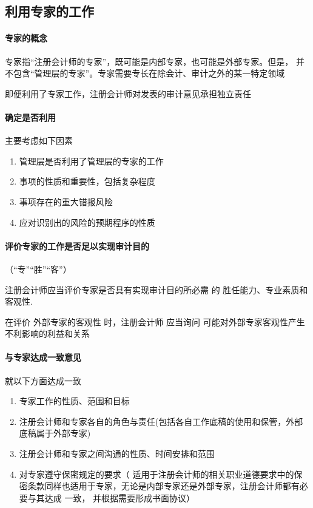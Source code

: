 \documentclass[UTF8,12pt]{ctexart}
\numberwithin{equation}{section} %
\numberwithin{figure}{section}
\numberwithin{table}{section}
\begin{document}
	
	\subsection{利用专家的工作}
	\paragraph{专家的概念}专家指“注册会计师的专家”，既可能是内部专家，也可能是外部专家。但是， 并  不包含“管理层的专家”。专家需要专长在除会计、审计之外的某一特定领域  
	
	即便利用了专家工作，注册会计师对发表的审计意见承担独立责任
	
	\paragraph{确定是否利用} 主要考虑如下因素
	\begin{enumerate}
		\item 管理层是否利用了管理层的专家的工作   
		
		\item 事项的性质和重要性，包括复杂程度
		
		\item 事项存在的重大错报风险
		
		\item 应对识别出的风险的预期程序的性质
	\end{enumerate}
	
	\paragraph{评价专家的工作是否足以实现审计目的}（“专”“胜”“客”）
	
	注册会计师应当评价专家是否具有实现审计目的所必需  的  胜任能力、专业素质和客观性.
	
	在评价  外部专家的客观性  时，注册会计师  应当询问 可能对外部专家客观性产生不利影响的利益和关系
	
	\paragraph{与专家达成一致意见}
	就以下方面达成一致
	\begin{enumerate}
		\item 专家工作的性质、范围和目标 
		
		\item 注册会计师和专家各自的角色与责任(包括各自工作底稿的使用和保管，外部底稿属于外部专家)
		
		\item 注册会计师和专家之间沟通的性质、时间安排和范围
		
		\item 对专家遵守保密规定的要求（ 适用于注册会计师的相关职业道德要求中的保密条款同样也适用于专家，无论是内部专家还是外部专家，注册会计师都有必要与其达成 一致，  并根据需要形成书面协议）
	\end{enumerate}
	
\end{document}
